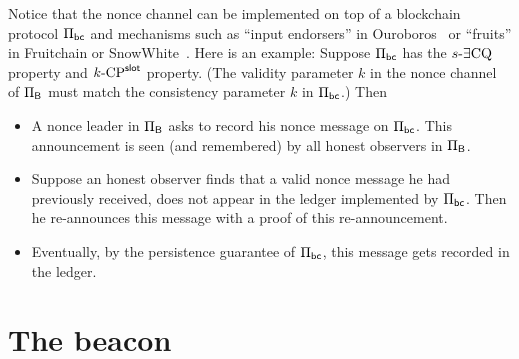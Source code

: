 Notice that the nonce channel can be implemented 
on top of a blockchain protocol $\Pi_\mathsf{bc}$ 
and mechanisms such as ``input endorsers'' in Ouroboros~\cite{Ouroboros} 
or ``fruits'' in Fruitchain or SnowWhite~\cite{Fruitchains,SnowWhite}.
Here is an example: 
Suppose $\Pi_\mathsf{bc}$ has the ${s}\text{-}\exists\mathrm{CQ}$ property and ${k}\text{-}\mathrm{CP}^{\mathsf{slot}}$ property. 
(The validity parameter $k$ in the nonce channel of $\Pi_{\mathsf{B}}$ 
must match the consistency parameter $k$ in $\Pi_\mathsf{bc}$.)
Then
\begin{itemize}
  \item A nonce leader in $\Pi_{\mathsf{B}}$ asks to record his nonce message on $\Pi_\mathsf{bc}$.
  This announcement is seen (and remembered) by all honest observers in $\Pi_{\mathsf{B}}$.
  
  \item Suppose an honest observer finds that a valid nonce message he had previously received, 
  does not appear in the ledger implemented by $\Pi_\mathsf{bc}$. 
  Then he re-announces this message with a proof of this re-announcement.

  \item Eventually, by the persistence guarantee of $\Pi_\mathsf{bc}$, 
  this message gets recorded in the ledger.
\end{itemize}
\noindent




\newcommand{\PublicElectionDistribution}{\hat{\mathcal{L}}}
\newcommand{\PrivateElectionDistribution}{\mathcal{L}}

\section{The beacon}




